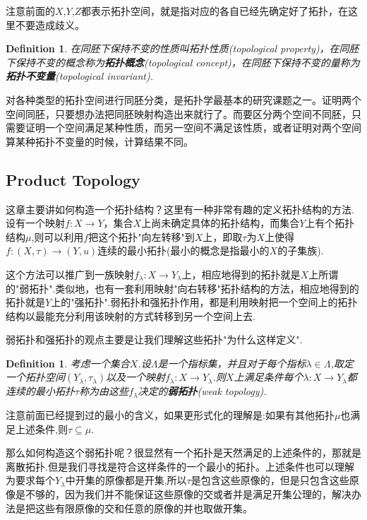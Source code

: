 \documentclass{article}
\newtheorem{definition}[theorem]{Definition}
\newcommand*{\xfunc}[4]{{#2}\colon{#3}{#1}{#4}}
\newcommand*{\func}[3]{\xfunc{\to}{#1}{#2}{#3}}
\begin{document}
注意前面的$X$,$Y$,$Z$都表示拓扑空间，就是指对应的各自已经先确定好了拓扑，在这里不要造成歧义。

\begin{definition}
在同胚下保持不变的性质叫拓扑性质(topological property)，在同胚下保持不变的概念称为\textbf{拓扑概念}(topological concept)，在同胚下保持不变的量称为\textbf{拓扑不变量}(topological invariant).
\end{definition}

对各种类型的拓扑空间进行同胚分类，是拓扑学最基本的研究课题之一。证明两个空间同胚，只要想办法把同胚映射构造出来就行了。而要区分两个空间不同胚，只需要证明一个空间满足某种性质，而另一空间不满足该性质，或者证明对两个空间算某种拓扑不变量的时候，计算结果不同。


\newpage
\subsection{Product Topology}
这章主要讲如何构造一个拓扑结构？这里有一种非常有趣的定义拓扑结构的方法.设有一个映射$\func{f}{X}{Y}$，集合$X$上尚未确定具体的拓扑结构，而集合$Y$上有个拓扑结构$\mu$,则可以利用$f$把这个拓扑"向左转移"到$X$上，即取$\tau$为$X$上使得$\func{f}{(X,\tau)}{(Y,u)}$连续的最小拓扑(最小的概念是指最小的$X$的子集族).

这个方法可以推广到一族映射$\func{f_\lambda}{X}{Y_\lambda}$上，相应地得到的拓扑就是$X$上所谓的"弱拓扑".类似地，也有一套利用映射"向右转移"拓扑结构的方法，相应地得到的拓扑就是$Y$上的"强拓扑".弱拓扑和强拓扑作用，都是利用映射把一个空间上的拓扑结构以最能充分利用该映射的方式转移到另一个空间上去.

弱拓扑和强拓扑的观点主要是让我们理解这些拓扑"为什么这样定义".


\begin{definition}
考虑一个集合$X$.设$\Lambda$是一个指标集，并且对于每个指标$\lambda \in \Lambda$,取定一个拓扑空间$(Y_\lambda,\tau_\lambda)$以及一个映射$\func{f_\lambda}{X}{Y_\lambda}$.则$X$上满足条件每个$\func{\lambda}{X}{Y_\lambda}$都连续的最小拓扑$\tau$称为由这些$f_\lambda$决定的\textbf{弱拓扑}(weak topology).
\end{definition}

注意前面已经提到过的最小的含义，如果更形式化的理解是:如果有其他拓扑$\mu$也满足上述条件,则$\tau \subseteq \mu$.

那么如何构造这个弱拓扑呢？很显然有一个拓扑是天然满足的上述条件的，那就是离散拓扑.但是我们寻找是符合这样条件的一个最小的拓扑。上述条件也可以理解为要求每个$Y_\lambda$中开集的原像都是开集,所以$\tau$是包含这些原像的，但是只包含这些原像是不够的，因为我们并不能保证这些原像的交或者并是满足开集公理的，解决办法是把这些有限原像的交和任意的原像的并也取做开集。
\end{document}
